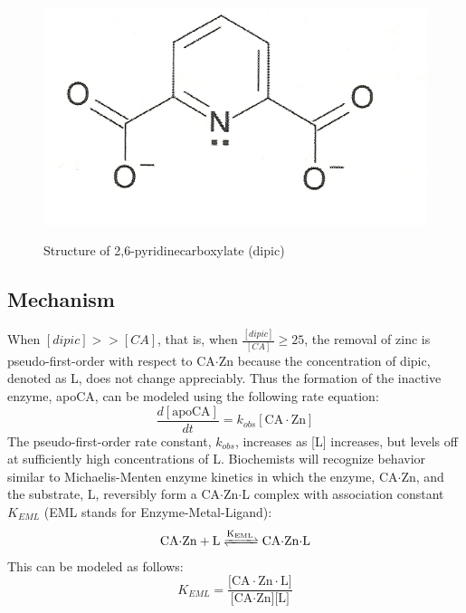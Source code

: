 \begin{figure}[h]
  \includegraphics[scale=0.5]{./Figures/dipic.jpg}\\
  \caption{Structure of 2,6-pyridinecarboxylate (dipic)\cite{bib:lab_manual}}\label{fig:dipic}
\end{figure}

\subsection{Mechanism}
When $[dipic] >> [CA]$, that is, when $\frac{[dipic]}{[CA]} \ge 25$, the removal of zinc is pseudo-first-order with respect to CA$\cdot$Zn because the concentration of dipic, denoted as L, does not change appreciably. Thus the formation of the inactive enzyme, apoCA, can be modeled using the following rate equation:
\begin{equation}\label{eqn:apoCA_kobs}
\frac{d[\text{apoCA}]}{dt}=k_{obs}[\text{CA$\cdot$Zn}]
\end{equation}
The pseudo-first-order rate constant, $k_{obs}$, increases as [L] increases, but levels off at sufficiently high concentrations of L. Biochemists will recognize behavior similar to Michaelis-Menten enzyme kinetics in which the enzyme, CA$\cdot$Zn, and the substrate, L, reversibly form a CA$\cdot$Zn$\cdot$L complex with association constant $K_{EML}$ (EML stands for Enzyme-Metal-Ligand):
\begin{align}\label{eqn:KEML_reaction}
\ce{CA$\cdot$Zn + L
<=>[\ce{K_{EML}}]
CA$\cdot$Zn$\cdot$L}
\end{align}
This can be modeled as follows:
\begin{equation}\label{eqn:KEML_expression}
K_{EML}=\frac{\text{[CA$\cdot$Zn$\cdot$L]}}{\text{[CA$\cdot$Zn][L]}}
\end{equation}

